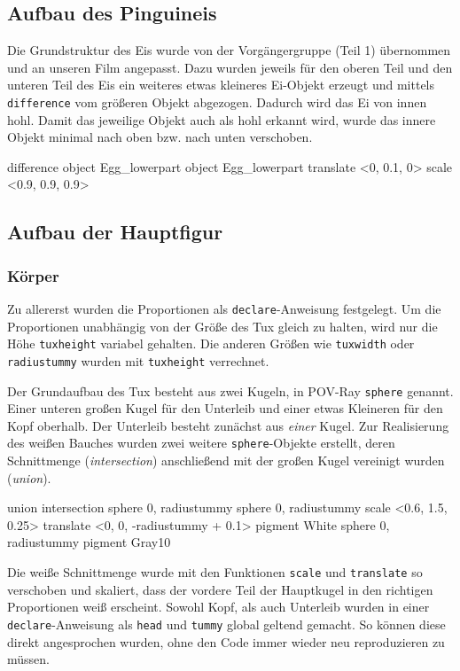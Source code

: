 \documentclass[11pt,parskip]{scrartcl}
\begin{document}
\subsection{Aufbau des Pinguineis}
Die Grundstruktur des Eis wurde von der Vorgängergruppe (Teil 1) übernommen
und an unseren Film angepasst. Dazu wurden jeweils für den oberen Teil und den
unteren Teil des Eis ein weiteres etwas kleineres Ei-Objekt erzeugt und mittels
\texttt{difference} vom größeren Objekt abgezogen. Dadurch wird das Ei von
innen hohl. Damit das jeweilige Objekt auch als hohl erkannt wird, wurde das
innere Objekt minimal nach oben bzw. nach unten verschoben.
%
\begin{tcblisting}{}
    difference{
    object{ Egg_lowerpart }
    object{
      Egg_lowerpart
      translate <0, 0.1, 0>
      scale <0.9, 0.9, 0.9>
    }
  }
\end{tcblisting}


\subsection{Aufbau der Hauptfigur}

\subsubsection{Körper}
Zu allererst wurden die Proportionen als \texttt{declare}-Anweisung festgelegt.
Um die Proportionen unabhängig von der Größe des Tux gleich zu halten, wird
nur die Höhe \texttt{tuxheight} variabel gehalten. Die anderen Größen wie
\texttt{tuxwidth} oder \texttt{radiustummy} wurden mit \texttt{tuxheight}
verrechnet.

Der Grundaufbau des Tux besteht aus zwei Kugeln, in POV-Ray \texttt{sphere}
genannt. Einer unteren großen Kugel für den Unterleib und einer etwas Kleineren
für den Kopf oberhalb. Der Unterleib besteht zunächst aus \emph{einer}
Kugel. Zur Realisierung des weißen Bauches wurden zwei weitere
\texttt{sphere}-Objekte erstellt, deren Schnittmenge (\emph{intersection})
anschließend mit der großen Kugel vereinigt wurden (\emph{union}).
%
\begin{tcblisting}{}
  union{
    intersection{
      sphere{ 0, radiustummy }
      sphere{ 0, radiustummy }
      scale <0.6, 1.5, 0.25>
      translate <0, 0, -radiustummy + 0.1>
    }
    pigment{ White }
    sphere{
      0, radiustummy
      pigment{ Gray10 }
    }
  }
\end{tcblisting}
%
Die weiße Schnittmenge wurde mit den Funktionen \texttt{scale} und
\texttt{translate} so verschoben und skaliert, dass der vordere Teil der
Hauptkugel in den richtigen Proportionen weiß erscheint. Sowohl Kopf, als auch
Unterleib wurden in einer \texttt{declare}-Anweisung als \texttt{head} und
\texttt{tummy} global geltend gemacht. So können diese direkt angesprochen
wurden, ohne den Code immer wieder neu reproduzieren zu müssen.
\end{document}
